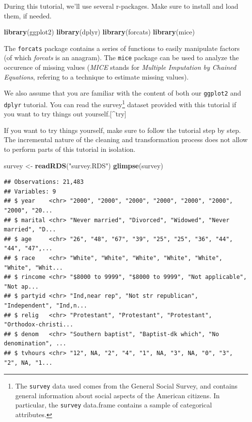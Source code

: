 \documentclass[]{tufte-book}
\newenvironment{Shaded}{}{}
\newcommand{\KeywordTok}[1]{\textcolor[rgb]{0.00,0.44,0.13}{\textbf{#1}}}
\newcommand{\NormalTok}[1]{#1}
\newcommand{\StringTok}[1]{\textcolor[rgb]{0.25,0.44,0.63}{#1}}
\begin{document}
During this tutorial, we'll use several r-packages. Make sure to install and load them, if needed.

\begin{Shaded}
\begin{Highlighting}[]
\KeywordTok{library}\NormalTok{(ggplot2)}
\KeywordTok{library}\NormalTok{(dplyr)}
\KeywordTok{library}\NormalTok{(forcats)}
\KeywordTok{library}\NormalTok{(mice)}
\end{Highlighting}
\end{Shaded}

The \texttt{forcats} package contains a series of functions to easily manipulate factors (of which \emph{forcats} is an anagram). The \texttt{mice} package can be used to analyze the occurence of missing values (\emph{MICE} stands for \emph{Multiple Imputation by Chained Equations}, refering to a technique to estimate missing values).

We also assume that you are familiar with the content of both our \texttt{ggplot2} and \texttt{dplyr} tutorial. You can read the survey\footnote{The \texttt{survey} data used comes from the General Social Survey, and contains general information about social aspects of the American citizens. In particular, the \texttt{survey} data.frame contains a sample of categorical attributes.} dataset provided with this tutorial if you want to try things out yourself.{[}\^{}try{]}

If you want to try things yourself, make sure to follow the tutorial step by step. The incremental nature of the cleaning and transformation process does not allow to perform parts of this tutorial in isolation.

\begin{Shaded}
\begin{Highlighting}[]
\NormalTok{survey <-}\StringTok{ }\KeywordTok{readRDS}\NormalTok{(}\StringTok{"survey.RDS"}\NormalTok{)}
\KeywordTok{glimpse}\NormalTok{(survey)}
\end{Highlighting}
\end{Shaded}

\begin{verbatim}
## Observations: 21,483
## Variables: 9
## $ year    <chr> "2000", "2000", "2000", "2000", "2000", "2000", "2000", "20...
## $ marital <chr> "Never married", "Divorced", "Widowed", "Never married", "D...
## $ age     <chr> "26", "48", "67", "39", "25", "25", "36", "44", "44", "47",...
## $ race    <chr> "White", "White", "White", "White", "White", "White", "Whit...
## $ rincome <chr> "$8000 to 9999", "$8000 to 9999", "Not applicable", "Not ap...
## $ partyid <chr> "Ind,near rep", "Not str republican", "Independent", "Ind,n...
## $ relig   <chr> "Protestant", "Protestant", "Protestant", "Orthodox-christi...
## $ denom   <chr> "Southern baptist", "Baptist-dk which", "No denomination", ...
## $ tvhours <chr> "12", NA, "2", "4", "1", NA, "3", NA, "0", "3", "2", NA, "1...
\end{verbatim}
\end{document}
